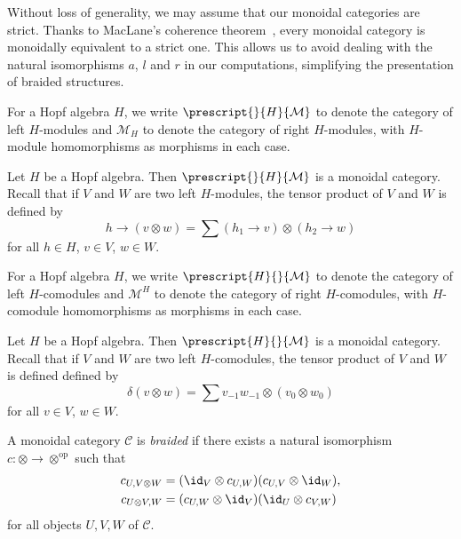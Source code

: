\documentclass[12pt]{amsproc}
\newcommand{\ydH}{\prescript{H}{H}{\mathcal{YD}}}
\newcommand{\lmod}[1]{\prescript{}{#1}{\mathcal{M}}}
\newcommand{\rmod}[1]{\mathcal{M}_{#1}}
\newcommand{\lcomod}[1]{\prescript{#1}{}{\mathcal{M}}}
\newcommand{\rcomod}[1]{\mathcal{M}^{#1}}
\begin{document}
Without loss of generality, we may assume that our monoidal categories are strict. Thanks to 
MacLane's coherence theorem~\cite[Theorem XI.5.3]{zbMATH00706259}, every monoidal category is monoidally equivalent to a strict one. This allows us to avoid dealing with the natural isomorphisms $a$, $l$ and $r$ in our computations, simplifying the presentation of braided structures.

For a Hopf algebra $H$, 
we write $\lmod{H}$ to denote the category of 
left $H$-modules and $\rmod{H}$ 
to denote the category of right $H$-modules, with $H$-module 
homomorphisms as morphisms in each case.

\begin{example}
Let $H$ be a Hopf algebra. Then $\lmod{H}$ is a monoidal
category.  Recall that if $V$ and $W$ are two left $H$-modules, the tensor
product of $V$ and $W$ is defined by 
\[
h\rightarrow(v\otimes w)=\sum (h_{1}\rightarrow v)\otimes(h_{2}\rightarrow w)
\]
for all $h\in H$, $v\in V$, $w\in W$. 
\end{example}

For a Hopf algebra $H$, 
we write $\lcomod{H}$ to denote the category of 
left $H$-comodules and $\rcomod{H}$ 
to denote the category of right $H$-comodules, with $H$-comodule 
homomorphisms as morphisms in each case.

\begin{example}
Let $H$ be a Hopf algebra. Then $\lcomod{H}$ is a monoidal
category.  Recall that if $V$ and $W$ are two left $H$-comodules, the tensor
product of $V$ and $W$ is defined defined by 
\[
\delta(v\otimes w)=\sum v_{-1}w_{-1}\otimes(v_0\otimes w_0)
\]
for all $v\in V$, $w\in W$.
\end{example}


\begin{definition}
A monoidal category $\mathcal{C}$ is \emph{braided} if there
exists a natural isomorphism $c:\otimes\to\otimes^{\mathrm{op}}$
such that
\begin{align}
c_{U,V\otimes W} & =(\id_{V}\otimes c_{U,W})(c_{U,V}\otimes\id_{W}),\label{eq:braided1}\\
c_{U\otimes V,W} & =(c_{U,W}\otimes\id_{V})(\id_{U}\otimes c_{V,W})\label{eq:braided2}
\end{align}
for all objects $U,V,W$ of $\mathcal{C}$. 
\end{definition}
\end{document}
